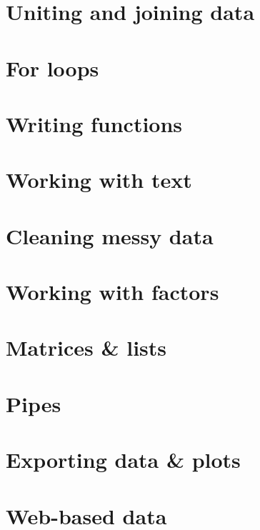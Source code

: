 \documentclass[
]{book}
\begin{document}
\hypertarget{uniting-and-joining-data}{%
\section{Uniting and joining data}\label{uniting-and-joining-data}}

\hypertarget{for-loops}{%
\section{For loops}\label{for-loops}}

\hypertarget{writing-functions}{%
\section{Writing functions}\label{writing-functions}}

\hypertarget{working-with-text}{%
\section{Working with text}\label{working-with-text}}

\hypertarget{cleaning-messy-data}{%
\section{Cleaning messy data}\label{cleaning-messy-data}}

\hypertarget{working-with-factors}{%
\section{Working with factors}\label{working-with-factors}}

\hypertarget{matrices-lists}{%
\section{Matrices \& lists}\label{matrices-lists}}

\hypertarget{pipes}{%
\section{Pipes}\label{pipes}}

\hypertarget{exporting-data-plots}{%
\section{Exporting data \& plots}\label{exporting-data-plots}}

\hypertarget{web-based-data}{%
\section{Web-based data}\label{web-based-data}}
\end{document}
